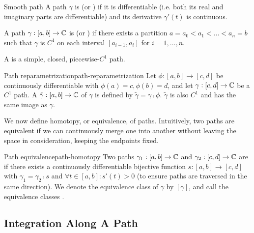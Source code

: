 \documentclass{styles/tufte}
\begin{document}
  \begin{definition}{Smooth path}{}
    A path $\gamma$ is  (or ) if it is differentiable (i.e. both its real and imaginary parts are differentiable) and its derivative $\gamma'(t)$ is continuous.
    
    A path $\gamma: [a, b] \to \mathbb{C}$ is  (or ) if there exists a partition $a = a_0 < a_1 < \dots < a_n = b$ such that $\gamma$ is $C^1$ on each interval $[a_{i-1}, a_i]$ for $i = 1, \dots, n$.
    
    A  is a simple, closed, piecewise-$C^1$ path.
  \end{definition}
  
  \begin{definition}{Path reparametrization}{path-reparametrization}
    Let $\phi: [a, b] \to [c, d]$ be continuously differentiable with $\phi(a) = c, \phi(b) = d$, and let $\gamma: [c, d] \to \mathbb{C}$ be a $C^1$ path. A  $\tilde{\gamma}: [a, b] \to \mathbb{C}$ of $\gamma$ is defined by $\tilde{\gamma} = \gamma \comp \phi$. $\tilde{\gamma}$ is also $C^1$ and has the same image as $\gamma$.
  \end{definition}
  
  We now define homotopy, or equivalence, of paths. Intuitively, two paths are equivalent if we can continuously merge one into another without leaving the space in consideration, keeping the endpoints fixed.
  
  \begin{definition}{Path equivalence}{path-homotopy}
    Two paths $\gamma_1: [a, b] \to \mathbb{C}$ and $\gamma_2: [c, d] \to \mathbb{C}$ are  if there exists a continuously differentiable bijective function $s: [a, b] \to [c, d]$ with $\gamma_1 = \gamma_2 \comp s$ and $\forall t \in [a, b]: s'(t) > 0$ (to ensure paths are traversed in the same direction). We denote the equivalence class of $\gamma$ by $[\gamma]$, and call the equivalence classes .
  \end{definition}


\subsection{Integration Along A Path}
  
\end{document}
